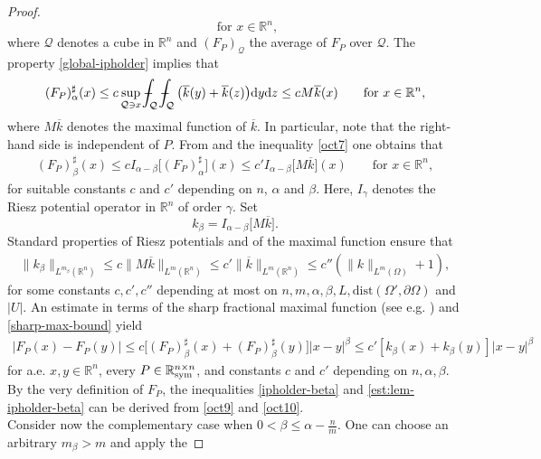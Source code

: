 \documentclass[leqno,11pt]{amsart}%
\numberwithin{equation}{section}
\def\real{\mathbb R}
\def\R{\mathbb R}
\def\Rn{{\mathbb R}^{n}}
\def\d{\mathrm{d}}
\def\dz{\d z}
\def\Sym{\real^{n\times n}_{\textup{sym}}}
\theoremstyle{definition}
\newcommand{\xint}[3]{{\setbox0=\hbox{$#1{#2#3}{\int}$}
   \vcenter{\hbox{$#2#3$}}\kern-.5\wd0}}
\newcommand{\mint}{\mathchoice
   {\xint\displaystyle\textstyle-}
   {\xint\textstyle\scriptstyle-}
   {\xint\scriptstyle\scriptscriptstyle-}
   {\xint\scriptscriptstyle\scriptscriptstyle-}
   \!\int}
\numberwithin{equation}{section}
\begin{document}
\begin{proof}
\begin{equation*}
    \qquad\mbox{for }x\in\R^n,
  \end{equation*}
  where  $\mathcal Q$ denotes a cube in $\Rn$ and $(F_P)_\mathcal Q$ the average of $F_P$ over $\mathcal Q$. The property \eqref{global-ipholder} implies that
\begin{equation}\label{oct7}
  (F_P)_\alpha^\sharp(x)
  \le
  c\sup_{\mathcal Q\ni x}\mint_\mathcal Q\mint_\mathcal Q\big(\overline k(y)+\overline k(z)\big)\d y\dz
  \le
  cM\overline k(x) \qquad\mbox{for }x\in\R^n,
\end{equation}
where $M\overline k$ denotes  the maximal function  of $\overline k$. In particular,  note that the right-hand
side is independent of $P$. From
\cite[Inequality (9.12)]{DevoreSharpley:1984}  and
the inequality \eqref{oct7} one obtains that
\begin{align}\label{sharp-max-bound}
  (F_P)_\beta^\sharp(x)
  \le
    cI_{\alpha-\beta}\big[(F_P)_\alpha^\sharp\big](x)
  \le
    c'I_{\alpha-\beta}\big[M\overline k\big](x) \qquad\mbox{for }x\in\R^n,
\end{align}
for suitable constants $c$ and $c'$   depending on $n$, $\alpha$ and $\beta$. Here, $I_\gamma$ denotes the Riesz potential operator in $\Rn$ of order $\gamma$.
Set 
$$k_\beta = I_{\alpha-\beta}\big[M\overline k\big].$$
Standard 
 properties of  Riesz potentials and of the maximal function ensure that
\begin{align}\label{oct10}
  \|k_\beta\|_{L^{ {m}_\beta}({ \Rn})}
  \le
  c\|M\overline k\|_{L^{ m}(\R^n)}
  \le
  c'\|\overline k\|_{L^{ m}(\R^n)}
  \le c''(\|k\|_{L^{ m}({\Omega})}+1),
\end{align}
for some constants $c, c', c''$ depending at most on $n, m,\alpha,\beta,L,\mathrm{dist}(\Omega',\partial\Omega)$ and $|U|$. 
An estimate in terms of the  sharp fractional maximal function (see
e.g. \cite[Inequality (2.16)]{DevoreSharpley:1984}) and \eqref{sharp-max-bound} yield
\begin{align}\label{oct9}
  |F_P(x)-F_P(y)|
 \le
  c\big[(F_P)_\beta^\sharp(x)+(F_P)_\beta^\sharp(y)\big]|x-y|^\beta \le
  c'[k_\beta(x)+k_\beta(y)]|x-y|^\beta  
\end{align}
for a.e. $x,y\in\R^n$, every $P\in\Sym$, and {constants $c$ and $c'$ depending on $n, \alpha, \beta$}.
By the very definition of $F_P$, the inequalities \eqref{ipholder-beta} and \eqref{est:lem-ipholder-beta}
can be derived from \eqref{oct9} and \eqref{oct10}. 
\\ Consider now the complementary case when 
$0<\beta\le \alpha -\frac{n}{ m}$. One can
choose an arbitrary $ m_\beta>m$ and apply the

\end{proof}
\end{document}
